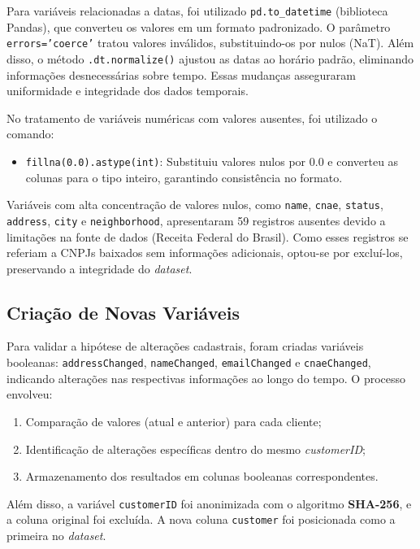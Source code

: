 \documentclass[12pt,a4paper]{article}
\begin{document}
Para variáveis relacionadas a datas, foi utilizado \texttt{pd.to\_datetime} (biblioteca Pandas), que converteu os valores em um formato padronizado. O parâmetro \texttt{errors='coerce'} tratou valores inválidos, substituindo-os por nulos (NaT). Além disso, o método \texttt{.dt.normalize()} ajustou as datas ao horário padrão, eliminando informações desnecessárias sobre tempo. Essas mudanças asseguraram uniformidade e integridade dos dados temporais.

No tratamento de variáveis numéricas com valores ausentes, foi utilizado o comando:
\begin{itemize}
    \item \texttt{fillna(0.0).astype(int)}: Substituiu valores nulos por 0.0 e converteu as colunas para o tipo inteiro, garantindo consistência no formato.
\end{itemize}

Variáveis com alta concentração de valores nulos, como \texttt{name}, \texttt{cnae}, \texttt{status}, \texttt{address}, \texttt{city} e \texttt{neighborhood}, apresentaram 59 registros ausentes devido a limitações na fonte de dados (Receita Federal do Brasil). Como esses registros se referiam a CNPJs baixados sem informações adicionais, optou-se por excluí-los, preservando a integridade do \textit{dataset}.

\subsection{Criação de Novas Variáveis}

Para validar a hipótese de alterações cadastrais, foram criadas variáveis booleanas: \texttt{addressChanged}, \texttt{nameChanged}, \texttt{emailChanged} e \texttt{cnaeChanged}, indicando alterações nas respectivas informações ao longo do tempo. O processo envolveu:
\begin{enumerate}
    \item Comparação de valores (atual e anterior) para cada cliente;
    \item Identificação de alterações específicas dentro do mesmo \textit{customerID};
    \item Armazenamento dos resultados em colunas booleanas correspondentes.
\end{enumerate}

Além disso, a variável \texttt{customerID} foi anonimizada com o algoritmo \textbf{SHA-256}, e a coluna original foi excluída. A nova coluna \texttt{customer} foi posicionada como a primeira no \textit{dataset}.
\end{document}
